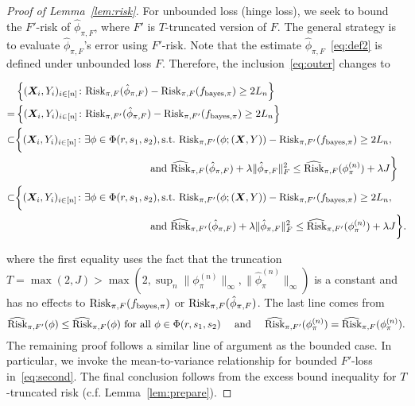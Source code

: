 \documentclass[11pt]{article}
\theoremstyle{plain}
\theoremstyle{definition}
\def\bayespif{f_{\textup{bayes},\pi}}
\def\riskF{\textup{Risk}_{\pi,F}}
\def\eriskF{\widehat{\textup{Risk}}_{\pi,F}}
\begin{document}
\begin{proof}[Proof of Lemma~\ref{lem:risk}]
For unbounded loss (hinge loss), we seek to bound the $F'$-risk of $\hat \phi_{\pi,F}$, where $F'$ is $T$-truncated version of $F$. The general strategy is to evaluate $\hat \phi_{\pi,F}$'s error using $F'$-risk.  Note that the estimate $\hat \phi_{\pi,F}$~\eqref{eq:def2} is defined under unbounded loss $F$. Therefore, the inclusion~\eqref{eq:outer} changes to

\begin{align}
&\left\{(\mX_i,Y_i)_{i\in[n]}\colon \riskF(\hat\phi_{\pi,F})-\riskF(\bayespif)\geq 2L_n \right\}\notag \\
= &
\left\{(\mX_i,Y_i)_{i\in[n]}\colon \textup{Risk}_{\pi,F'}(\hat\phi_{\pi,F})-\textup{Risk}_{\pi,F'}(\bayespif)\geq 2L_n \right\}\notag \\
\subset &
 \bigg\{(\mX_i,Y_i)_{i\in[n]}\colon \exists \phi\in\Phi(r,s_1,s_2), \text{s.t.}\  \textup{Risk}_{\pi,F'}(\phi; (\mX,Y))-\textup{Risk}_{\pi,F'}(\bayespif)\geq 2L_n, \notag \\&\hspace*{4.6cm} \text{and}\  \eriskF(\hat\phi_{\pi,F})+\lambda\FnormSize{}{\hat \phi_{\pi,F}}^2\leq \eriskF(\phi_{\pi}^{(n)})+\lambda J \bigg\}\notag \\
\subset &
 \bigg\{(\mX_i,Y_i)_{i\in[n]}\colon \exists \phi\in\Phi(r,s_1,s_2), \text{s.t.}\  \textup{Risk}_{\pi,F'}(\phi; (\mX,Y))-\textup{Risk}_{\pi,F'}(\bayespif)\geq 2L_n, \notag \\&\hspace*{4.6cm} \text{and}\  
 \widehat{\textup{Risk}}_{\pi,F'}(\hat\phi_{\pi,F})+\lambda\FnormSize{}{\hat \phi_{\pi,F}}^2\leq  \widehat{\textup{Risk}}_{\pi,F'}(\phi_{\pi}^{(n)})+\lambda J \bigg\}
.
\end{align}



where the  first equality uses the fact that the truncation $T= \max(2,J)>\max(2,\sup_n\|{\phi_\pi^{(n)}}\|_{\infty}, \|{\hat\phi_\pi^{(n)}}\|_{\infty})$ is a constant and has no effects to $\riskF(\bayespif)$ or $\riskF(\hat\phi_{\pi,F})$. The last line comes from 
\[
\widehat{\textup{Risk}}_{\pi,F'}(\phi)\leq \widehat{\textup{Risk}}_{\pi,F}(\phi) \text{ for all } \phi\in \Phi(r,s_1,s_2)\quad\text{ and } \quad \widehat{\textup{Risk}}_{\pi,F'}(\phi_\pi^{(n)})= \widehat{\textup{Risk}}_{\pi,F}(\phi_\pi^{(n)}).
\]
The remaining proof follows a similar line of argument as the bounded case. In particular, we invoke the mean-to-variance relationship for bounded $F'$-loss in~\eqref{eq:second}. The final conclusion follows from the excess bound inequality for $T$-truncated risk (c.f. Lemma~\ref{lem:prepare}).
\end{proof}
\end{document}
